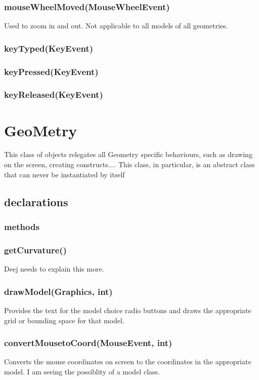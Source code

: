 \documentclass[a4paper,10pt]{report}
\begin{document}
\subsubsection{mouseWheelMoved(MouseWheelEvent)} Used to zoom in and out.  Not applicable to all models of all geometries.
\subsubsection{keyTyped(KeyEvent)}
\subsubsection{keyPressed(KeyEvent)}
\subsubsection{keyReleased(KeyEvent)}

\section{GeoMetry}
  This class of objects relegates all Geometry specific behaviours, such as drawing on the screen, creating constructs....  This class, in particular, is an abstract class that can never be instantiated by itself
 
 \subsection{declarations}

 \subsubsection{methods}
\subsubsection{getCurvature()} Deej needs to explain this more.
\subsubsection{drawModel(Graphics, int)} Provides the text for the model choice radio buttons and draws the appropriate grid or bounding space for that model.
\subsubsection{convertMousetoCoord(MouseEvent, int)} Converts the mouse coordinates on screen to the coordinates in the appropriate model.  I am seeing the possiblity of a model class.
\end{document}
